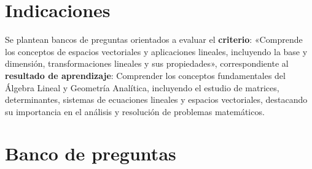 \documentclass[a4,11pt]{aleph-notas}
\begin{document}
\encabezado

\vspace*{-8mm}
\tableofcontents

\section{Indicaciones}

Se plantean bancos de preguntas orientados a evaluar el \textbf{criterio}: «Comprende los conceptos de espacios vectoriales y aplicaciones lineales, incluyendo la base y dimensión, transformaciones lineales y sus propiedades», correspondiente al \textbf{resultado de aprendizaje}: Comprender los conceptos fundamentales del Álgebra Lineal y Geometría Analítica, incluyendo el estudio de matrices, determinantes, sistemas de ecuaciones lineales y espacios vectoriales, destacando su importancia en el análisis y resolución de problemas matemáticos.

\section{Banco de preguntas}
\end{document}
